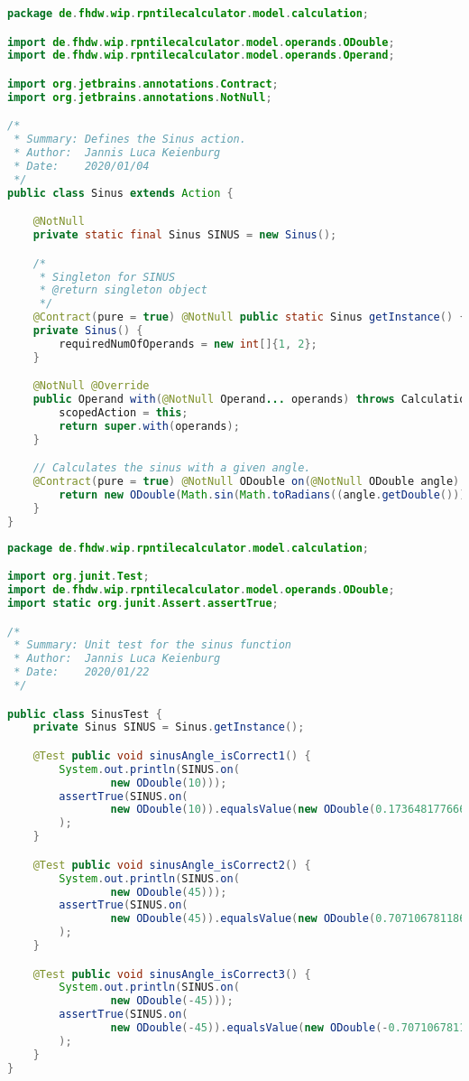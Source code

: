 \begin{lstlisting}[caption=Sinus (Keienburg),label=list:Sinus,language=Java]
package de.fhdw.wip.rpntilecalculator.model.calculation;

import de.fhdw.wip.rpntilecalculator.model.operands.ODouble;
import de.fhdw.wip.rpntilecalculator.model.operands.Operand;

import org.jetbrains.annotations.Contract;
import org.jetbrains.annotations.NotNull;

/*
 * Summary: Defines the Sinus action.
 * Author:  Jannis Luca Keienburg
 * Date:    2020/01/04
 */
public class Sinus extends Action {

    @NotNull
    private static final Sinus SINUS = new Sinus();

    /*
     * Singleton for SINUS
     * @return singleton object
     */
    @Contract(pure = true) @NotNull public static Sinus getInstance() { return SINUS; }
    private Sinus() {
        requiredNumOfOperands = new int[]{1, 2};
    }

    @NotNull @Override
    public Operand with(@NotNull Operand... operands) throws CalculationException {
        scopedAction = this;
        return super.with(operands);
    }

    // Calculates the sinus with a given angle.
    @Contract(pure = true) @NotNull ODouble on(@NotNull ODouble angle) {
        return new ODouble(Math.sin(Math.toRadians((angle.getDouble()))));
    }
}
\end{lstlisting}    

\begin{lstlisting}[caption=SinusTest (Keienburg),label=list:SinusTest,language=Java]
package de.fhdw.wip.rpntilecalculator.model.calculation;

import org.junit.Test;
import de.fhdw.wip.rpntilecalculator.model.operands.ODouble;
import static org.junit.Assert.assertTrue;

/*
 * Summary: Unit test for the sinus function
 * Author:  Jannis Luca Keienburg
 * Date:    2020/01/22
 */

public class SinusTest {
    private Sinus SINUS = Sinus.getInstance();

    @Test public void sinusAngle_isCorrect1() {
        System.out.println(SINUS.on(
                new ODouble(10)));
        assertTrue(SINUS.on(
                new ODouble(10)).equalsValue(new ODouble(0.17364817766693033))
        );
    }

    @Test public void sinusAngle_isCorrect2() {
        System.out.println(SINUS.on(
                new ODouble(45)));
        assertTrue(SINUS.on(
                new ODouble(45)).equalsValue(new ODouble(0.7071067811865475))
        );
    }

    @Test public void sinusAngle_isCorrect3() {
        System.out.println(SINUS.on(
                new ODouble(-45)));
        assertTrue(SINUS.on(
                new ODouble(-45)).equalsValue(new ODouble(-0.7071067811865475))
        );
    }
}
\end{lstlisting} 

